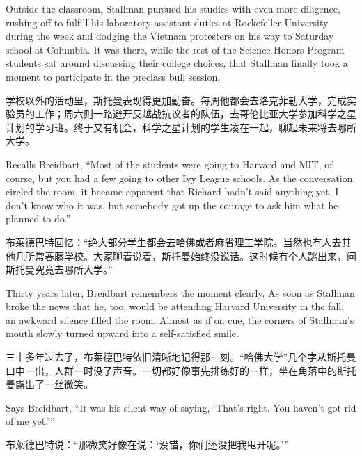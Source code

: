\ifdefined\eng
Outside the classroom, Stallman pursued his studies with even more diligence, rushing off to fulfill his laboratory-assistant duties at Rockefeller University during the week and dodging the Vietnam protesters on his way to Saturday school at Columbia. It was there, while the rest of the Science Honors Program students sat around discussing their college choices, that Stallman finally took a moment to participate in the preclass bull session.
\fi

\ifdefined\chs
学校以外的活动里，斯托曼表现得更加勤奋。每周他都会去洛克菲勒大学，完成实验员的工作；周六则一路避开反越战抗议者的队伍，去哥伦比亚大学参加科学之星计划的学习班。终于又有机会，科学之星计划的学生凑在一起，聊起未来将去哪所大学。
\fi

\ifdefined\eng
Recalls Breidbart, ``Most of the students were going to Harvard and MIT, of course, but you had a few going to other Ivy League schools. As the conversation circled the room, it became apparent that Richard hadn't said anything yet. I don't know who it was, but somebody got up the courage to ask him what he planned to do.''
\fi

\ifdefined\chs
布莱德巴特回忆：``绝大部分学生都会去哈佛或者麻省理工学院。当然也有人去其他几所常春藤学校。大家聊着说着，斯托曼始终没说话。这时候有个人跳出来，问斯托曼究竟去哪所大学。''
\fi

\ifdefined\eng
Thirty years later, Breidbart remembers the moment clearly. As soon as Stallman broke the news that he, too, would be attending Harvard University in the fall, an awkward silence filled the room. Almost as if on cue, the corners of Stallman's mouth slowly turned upward into a self-satisfied smile.
\fi

\ifdefined\chs
三十多年过去了，布莱德巴特依旧清晰地记得那一刻。``哈佛大学''几个字从斯托曼口中一出，人群一时没了声音。一切都好像事先排练好的一样，坐在角落中的斯托曼露出了一丝微笑。
\fi

\ifdefined\eng
Says Breidbart, ``It was his silent way of saying, `That's right. You haven't got rid of me yet.'\hspace{0.01in}''
\fi

\ifdefined\chs
布莱德巴特说：``那微笑好像在说：`没错，你们还没把我甩开呢。'\hspace{0.01in}''
\fi

\theendnotes
\setcounter{endnote}{0}
